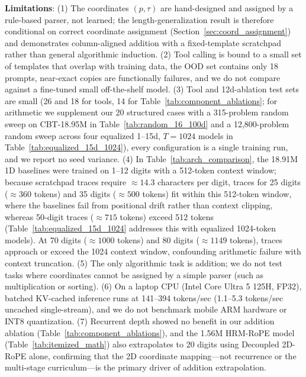 \documentclass[10pt,twocolumn]{article}
\begin{document}
\textbf{Limitations}: (1) The coordinates $(p,\tau)$ are hand-designed and assigned by a rule-based parser, not learned; the length-generalization result is therefore conditional on correct coordinate assignment (Section~\ref{sec:coord_assignment}) and demonstrates column-aligned addition with a fixed-template scratchpad rather than general algorithmic induction. (2) Tool calling is bound to a small set of templates that overlap with training data, the OOD set contains only 18 prompts, near-exact copies are functionally failures, and we do not compare against a fine-tuned small off-the-shelf model. (3) Tool and 12d-ablation test sets are small (26 and 18 for tools, 14 for Table~\ref{tab:component_ablations}; for arithmetic we supplement our 20 structured cases with a 315-problem random sweep on CBT-18.95M in Table~\ref{tab:random_16_100d} and a 12,800-problem random sweep across four equalized 1--15d, $T=1024$ models in Table~\ref{tab:equalized_15d_1024}), every configuration is a single training run, and we report no seed variance. (4) In Table~\ref{tab:arch_comparison}, the 18.91M 1D baselines were trained on 1--12 digits with a 512-token context window; because scratchpad traces require $\approx 14.3$ characters per digit, traces for 25 digits ($\approx 360$ tokens) and 35 digits ($\approx 500$ tokens) fit within this 512-token window, where the baselines fail from positional drift rather than context clipping, whereas 50-digit traces ($\approx 715$ tokens) exceed 512 tokens (Table~\ref{tab:equalized_15d_1024} addresses this with equalized 1024-token models). At 70 digits ($\approx 1000$ tokens) and 80 digits ($\approx 1149$ tokens), traces approach or exceed the 1024 context window, confounding arithmetic failure with context truncation. (5) The only algorithmic task is addition; we do not test tasks where coordinates cannot be assigned by a simple parser (such as multiplication or sorting). (6) On a laptop CPU (Intel Core Ultra 5 125H, FP32), batched KV-cached inference runs at 141--394 tokens/sec (1.1--5.3 tokens/sec uncached single-stream), and we do not benchmark mobile ARM hardware or INT8 quantization. (7) Recurrent depth showed no benefit in our addition ablation (Table~\ref{tab:component_ablations}), and the 1.56M HRM-RoPE model (Table~\ref{tab:itemized_math}) also extrapolates to 20 digits using Decoupled 2D-RoPE alone, confirming that the 2D coordinate mapping---not recurrence or the multi-stage curriculum---is the primary driver of addition extrapolation.
\end{document}
